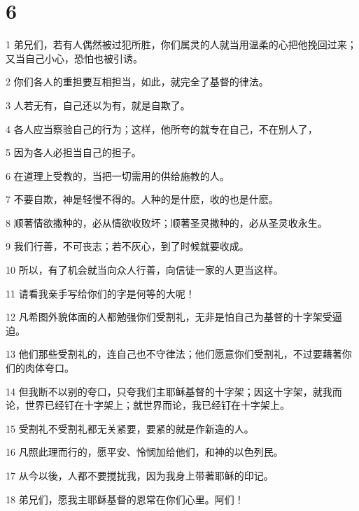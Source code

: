 \chapter{6}

\par 1 弟兄们，若有人偶然被过犯所胜，你们属灵的人就当用温柔的心把他挽回过来；又当自己小心，恐怕也被引诱。
\par 2 你们各人的重担要互相担当，如此，就完全了基督的律法。
\par 3 人若无有，自己还以为有，就是自欺了。
\par 4 各人应当察验自己的行为；这样，他所夸的就专在自己，不在别人了，
\par 5 因为各人必担当自己的担子。
\par 6 在道理上受教的，当把一切需用的供给施教的人。
\par 7 不要自欺，神是轻慢不得的。人种的是什麽，收的也是什麽。
\par 8 顺著情欲撒种的，必从情欲收败坏；顺著圣灵撒种的，必从圣灵收永生。
\par 9 我们行善，不可丧志；若不灰心，到了时候就要收成。
\par 10 所以，有了机会就当向众人行善，向信徒一家的人更当这样。
\par 11 请看我亲手写给你们的字是何等的大呢！
\par 12 凡希图外貌体面的人都勉强你们受割礼，无非是怕自己为基督的十字架受逼迫。
\par 13 他们那些受割礼的，连自己也不守律法；他们愿意你们受割礼，不过要藉著你们的肉体夸口。
\par 14 但我断不以别的夸口，只夸我们主耶稣基督的十字架；因这十字架，就我而论，世界已经钉在十字架上；就世界而论，我已经钉在十字架上。
\par 15 受割礼不受割礼都无关紧要，要紧的就是作新造的人。
\par 16 凡照此理而行的，愿平安、怜悯加给他们，和神的以色列民。
\par 17 从今以後，人都不要搅扰我，因为我身上带著耶稣的印记。
\par 18 弟兄们，愿我主耶稣基督的恩常在你们心里。阿们！


